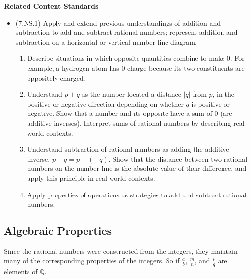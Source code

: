 \documentclass[
]{book}
\providecommand{\tightlist}{%
  \setlength{\itemsep}{0pt}\setlength{\parskip}{0pt}}
\newenvironment{standards}{}{}
\theoremstyle{definition}
\theoremstyle{definition}
\theoremstyle{definition}
\theoremstyle{definition}
\theoremstyle{remark}
\begin{document}
\begin{standards}

\begin{center}
\textbf{Related Content Standards}

\end{center}

\begin{itemize}
\tightlist
\item
  (7.NS.1) Apply and extend previous understandings of addition and subtraction to add and subtract rational numbers; represent addition and subtraction on a horizontal or vertical number line diagram.

  \begin{enumerate}
  \def\labelenumi{\alph{enumi}.}
  \tightlist
  \item
    Describe situations in which opposite quantities combine to make 0. For example, a hydrogen atom has 0 charge because its two constituents are oppositely charged.
  \item
    Understand \(p + q\) as the number located a distance \(|q|\) from \(p\), in the positive or negative direction depending on whether \(q\) is positive or negative. Show that a number and its opposite have a sum of \(0\) (are additive inverses). Interpret sums of rational numbers by describing real-world contexts.
  \item
    Understand subtraction of rational numbers as adding the additive inverse, \(p- q = p + (-q)\). Show that the distance between two rational numbers on the number line is the absolute value of their difference, and apply this principle in real-world contexts.
  \item
    Apply properties of operations as strategies to add and subtract rational numbers.
  \end{enumerate}
\end{itemize}

\end{standards}

\hypertarget{algebraic-properties}{%
\subsection{Algebraic Properties}\label{algebraic-properties}}

Since the rational numbers were constructed from the integers, they maintain many of the corresponding properties of the integers. So if \(\frac{a}{b}\), \(\frac{m}{n}\), and \(\frac{p}{q}\) are elements of \(\mathbb{Q}\).
\end{document}
